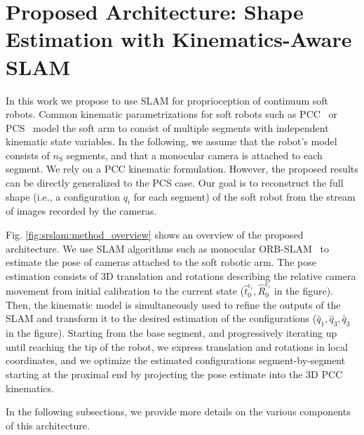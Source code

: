 \section{Proposed Architecture: Shape Estimation with Kinematics-Aware SLAM}
\label{sec:srslam:pose_estimation}

In this work we propose to use \gls{SLAM} for proprioception of continuum soft robots. Common kinematic parametrizations for soft robots such as \gls{PCC}~\cite{webster2010design} or \gls{PCS}~\cite{renda2018discrete} model the soft arm to consist of multiple segments with independent kinematic state variables. 
In the following, we assume that the robot's model consists of $n_{\mathrm{S}}$ segments, and that a monocular camera is attached to each segment. We rely on a \gls{PCC} kinematic formulation. However, the proposed results can be directly generalized to the PCS case.
%
%
Our goal is to reconstruct the full shape (i.e., a configuration $q_i$ for each segment) of the soft robot from the stream of images recorded by the cameras.

Fig. \ref{fig:srslam:method_overview} shows an overview of the proposed architecture.
%
We use \gls{SLAM} algorithms such as monocular ORB-SLAM~\cite{mur2017orb} to estimate the pose of cameras attached to the soft robotic arm.  The pose estimation consists of 3D translation and rotations describing the relative camera movement from initial calibration to the current state ($\hat{t}_0^{\mathrm{c}_i},\hat{R}_0^{\mathrm{c}_i}$ in the figure). Then, the kinematic model is simultaneously used to refine the outputs of the SLAM and transform it to the desired estimation of the configurations ($\hat{q}_1,\hat{q}_3,\hat{q}_3$ in the figure). Starting from the base segment, and progressively iterating up until reaching the tip of the robot, we express translation and rotations in local coordinates, and we optimize the estimated configurations segment-by-segment starting at the proximal end by projecting the pose estimate into the 3D \gls{PCC} kinematics.

In the following subsections, we provide more details on the various components of this architecture.

